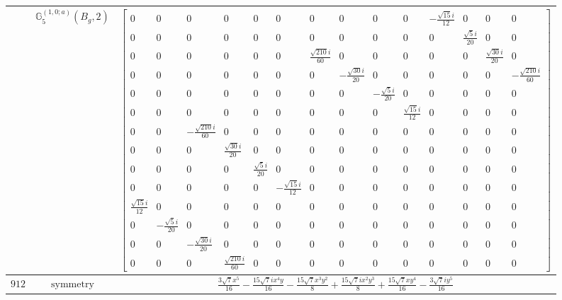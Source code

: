 \documentclass[fleqn,8pt,landscape]{jsarticle}
\begin{document}
\begin{longtable}{ccc}
$  $ & $ \mathbb{G}_{5}^{(1,0;a)}(B_{g},2) $ & $ \begin{bmatrix} 0 & 0 & 0 & 0 & 0 & 0 & 0 & 0 & 0 & 0 & - \frac{\sqrt{15} i}{12} & 0 & 0 & 0 \\ 0 & 0 & 0 & 0 & 0 & 0 & 0 & 0 & 0 & 0 & 0 & \frac{\sqrt{5} i}{20} & 0 & 0 \\ 0 & 0 & 0 & 0 & 0 & 0 & \frac{\sqrt{210} i}{60} & 0 & 0 & 0 & 0 & 0 & \frac{\sqrt{30} i}{20} & 0 \\ 0 & 0 & 0 & 0 & 0 & 0 & 0 & - \frac{\sqrt{30} i}{20} & 0 & 0 & 0 & 0 & 0 & - \frac{\sqrt{210} i}{60} \\ 0 & 0 & 0 & 0 & 0 & 0 & 0 & 0 & - \frac{\sqrt{5} i}{20} & 0 & 0 & 0 & 0 & 0 \\ 0 & 0 & 0 & 0 & 0 & 0 & 0 & 0 & 0 & \frac{\sqrt{15} i}{12} & 0 & 0 & 0 & 0 \\ 0 & 0 & - \frac{\sqrt{210} i}{60} & 0 & 0 & 0 & 0 & 0 & 0 & 0 & 0 & 0 & 0 & 0 \\ 0 & 0 & 0 & \frac{\sqrt{30} i}{20} & 0 & 0 & 0 & 0 & 0 & 0 & 0 & 0 & 0 & 0 \\ 0 & 0 & 0 & 0 & \frac{\sqrt{5} i}{20} & 0 & 0 & 0 & 0 & 0 & 0 & 0 & 0 & 0 \\ 0 & 0 & 0 & 0 & 0 & - \frac{\sqrt{15} i}{12} & 0 & 0 & 0 & 0 & 0 & 0 & 0 & 0 \\ \frac{\sqrt{15} i}{12} & 0 & 0 & 0 & 0 & 0 & 0 & 0 & 0 & 0 & 0 & 0 & 0 & 0 \\ 0 & - \frac{\sqrt{5} i}{20} & 0 & 0 & 0 & 0 & 0 & 0 & 0 & 0 & 0 & 0 & 0 & 0 \\ 0 & 0 & - \frac{\sqrt{30} i}{20} & 0 & 0 & 0 & 0 & 0 & 0 & 0 & 0 & 0 & 0 & 0 \\ 0 & 0 & 0 & \frac{\sqrt{210} i}{60} & 0 & 0 & 0 & 0 & 0 & 0 & 0 & 0 & 0 & 0 \end{bmatrix} $ \\ \hline
$ 912 $ & $ \text{symmetry} $ & $ \frac{3 \sqrt{7} x^{5}}{16} - \frac{15 \sqrt{7} i x^{4} y}{16} - \frac{15 \sqrt{7} x^{3} y^{2}}{8} + \frac{15 \sqrt{7} i x^{2} y^{3}}{8} + \frac{15 \sqrt{7} x y^{4}}{16} - \frac{3 \sqrt{7} i y^{5}}{16} $ \\

\end{longtable}
\end{document}
